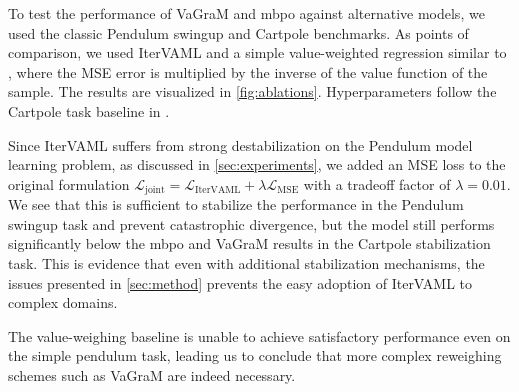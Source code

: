 To test the performance of VaGraM and \ac{mbpo} against alternative models, we used the classic Pendulum swingup and Cartpole benchmarks. As points of comparison, we used IterVAML \parencite{itervaml} and a simple value-weighted regression similar to \textcite{nair2020goal}, where the MSE error is multiplied by the inverse of the value function of the sample. The results are visualized in \autoref{fig:ablations}. Hyperparameters follow the Cartpole task baseline in \textcite{Pineda2021MBRL}.

Since IterVAML suffers from strong destabilization on the Pendulum model learning problem, as discussed in \autoref{sec:experiments}, we added an MSE loss to the original formulation $\mathcal{L}_\text{joint} = \mathcal{L}_\text{IterVAML} + \lambda \mathcal{L}_\text{MSE}$ with a tradeoff factor of $\lambda = 0.01$. We see that this is sufficient to stabilize the performance in the Pendulum swingup task and prevent catastrophic divergence, but the model still performs significantly below the \ac{mbpo} and VaGraM results in the Cartpole stabilization task. This is evidence that even with additional stabilization mechanisms, the issues presented in \autoref{sec:method} prevents the easy adoption of IterVAML to complex domains.

The value-weighing baseline is unable to achieve satisfactory performance even on the simple pendulum task, leading us to conclude that more complex reweighing schemes such as VaGraM are indeed necessary.

